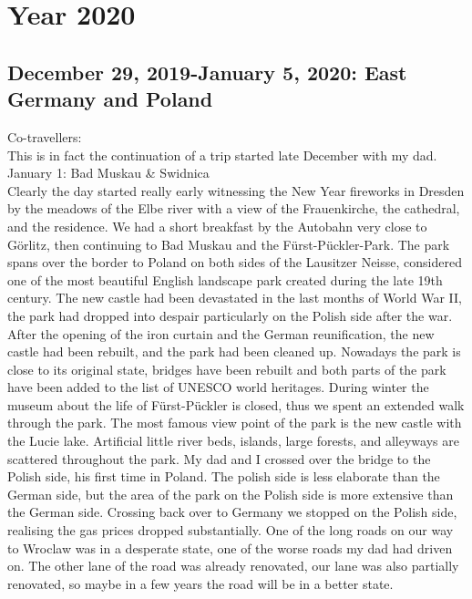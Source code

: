\chapter{Year 2020}
\label{2020}

\section{December 29, 2019-January 5, 2020: East Germany and Poland}
\label{2020:GermanyPoland}

Co-travellers:\\
This is in fact the continuation of a trip started late December with my dad.\\

January 1: Bad Muskau \& Swidnica\\
Clearly the day started really early witnessing the New Year fireworks in Dresden by the meadows of the Elbe river with a view of the Frauenkirche, the cathedral, and the residence. We had a short breakfast by the Autobahn very close to G\"orlitz, then continuing to Bad Muskau and the F\"urst-P\"uckler-Park. The park spans over the border to Poland on both sides of the Lausitzer Neisse, considered one of the most beautiful English landscape park created during the late 19th century. The new castle had been devastated in the last months of World War II, the park had dropped into despair particularly on the Polish side after the war. After the opening of the iron curtain and the German reunification, the new castle had been rebuilt, and the park had been cleaned up. Nowadays the park is close to its original state, bridges have been rebuilt and both parts of the park have been added to the list of UNESCO world heritages. During winter the museum about the life of F\"urst-P\"uckler is closed, thus we spent an extended walk through the park. The most famous view point of the park is the new castle with the Lucie lake. Artificial little river beds, islands, large forests, and alleyways are scattered throughout the park. My dad and I crossed over the bridge to the Polish side, his first time in Poland. The polish side is less elaborate than the German side, but the area of the park on the Polish side is more extensive than the German side. Crossing back over to Germany we stopped on the Polish side, realising the gas prices dropped substantially. One of the long roads on our way to Wroclaw was in a desperate state, one of the worse roads my dad had driven on. The other lane of the road was already renovated, our lane was also partially renovated, so maybe in a few years the road will be in a better state. \\

